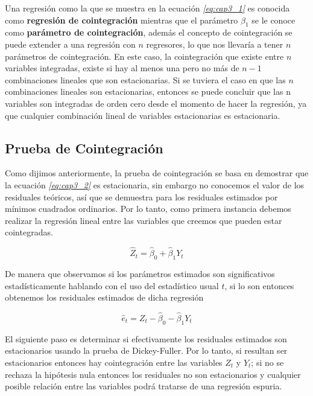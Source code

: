 Una regresión como la que se muestra en la ecuación \textit{\ref{eq:cap3_1}} es conocida como \textbf{regresión de cointegración}  mientras que el parámetro $\beta_1$ se le conoce como \textbf{parámetro de cointegración}, además el concepto de cointegración se puede extender a una regresión con $n$ regresores, lo que nos llevaría a tener $n$ parámetros de cointegración. En este caso, la cointegración que existe entre $n$ variables integradas, existe si hay al menos una pero no más de $n-1$ combinaciones lineales que son estacionarias. Si se tuviera el caso en que las $n$ combinaciones lineales son estacionarias, entonces se puede concluir que las n variables son integradas de orden cero desde el momento de hacer la regresión, ya que cualquier combinación lineal de variables estacionarias es estacionaria.
   
\subsection{Prueba de Cointegración}

Como dijimos anteriormente, la prueba de cointegración se basa en demostrar que la ecuación \textit{\ref{eq:cap3_2}} es estacionaria, sin embargo no conocemos el valor de los residuales teóricos, así que se demuestra para los residuales estimados por mínimos cuadrados ordinarios. Por lo tanto, como primera instancia debemos realizar la regresión lineal entre las variables que creemos que pueden estar cointegradas.

\begin{equation}
\hat{Z}_t= \hat{\beta}_0 + \hat{\beta}_1Y_t
\end{equation}

De manera que observamos si los parámetros estimados son significativos estadísticamente hablando con el uso del estadístico usual $t$, si lo son entonces obtenemos los residuales estimados de dicha regresión

\begin{equation}
\hat{e}_t= Z_t- \hat{\beta}_0 - \hat{\beta}_1Y_t
\end{equation}

El siguiente paso es determinar si efectivamente los residuales estimados son estacionarios usando la prueba de Dickey-Fuller. Por lo tanto, si resultan ser estacionarios entonces hay cointegración entre las variables $Z_t$ y $Y_t$; si no se rechaza la hipótesis nula entonces los residuales no son estacionarios y cualquier posible relación entre las variables podrá tratarse de  una regresión espuria.\bigskip

